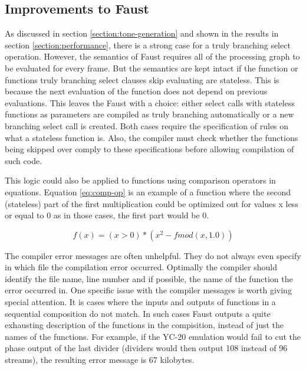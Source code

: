 \documentclass[11pt,a4paper]{article}
\begin{document}
\subsection{Improvements to Faust}

As discussed in section \ref{section:tone-generation} and shown in the results in section \ref{section:performance}, there is a strong case for a truly branching select operation. However, the semantics of Faust requires all of the processing graph to be evaluated for every frame. But the semantics are kept intact if the function or functions truly branching select clauses skip evaluating are stateless. This is because the next evaluation of the function does not depend on previous evaluations. This leaves the Faust with a choice: either select calls with stateless functions as parameters are compiled as truly branching automatically or a new branching select call is created. Both cases require the specification of rules on what a stateless function is. Also, the compiler must check whether the functions being skipped over comply to these specifications before allowing compilation of such code.

This logic could also be applied to functions using comparison operators in equations. Equation \ref{eq:comp-op} is an example of a function where the second (stateless) part of the first multiplication could be optimized out for values x less or equal to 0 as in those cases, the first part would be 0.

\begin{equation}
\label{eq:comp-op}
f(x) = (x>0) * (x^2-fmod(x,1.0))
\end{equation}


The compiler error messages are often unhelpful. They do not always even specify in which file the compilation error occurred. Optimally the compiler should identify the file name, line number and if possible, the name of the function the error occurred in. One specific issue with the compiler messages is worth giving special attention. It is cases where the inputs and outputs of functions in a sequential composition do not match. In such cases Faust outputs a quite exhausting description of the functions in the compisition, instead of just the names of the functions. For example, if the YC-20 emulation would fail to cut the phase output of the last divider (dividers would then output 108 instead of 96 streams), the resulting error message is 67 kilobytes.
\end{document}
